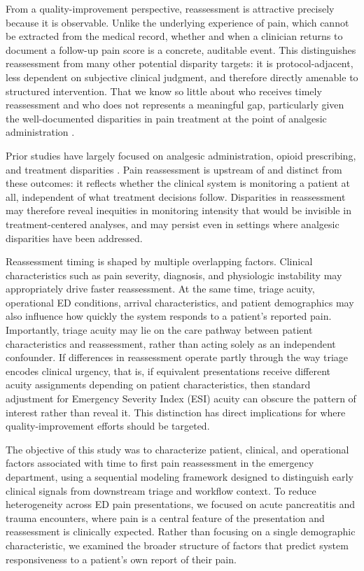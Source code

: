 \documentclass[11pt]{article}
\begin{document}
From a quality-improvement perspective, reassessment is attractive precisely because it is observable.
Unlike the underlying experience of pain, which cannot be extracted from the medical record, whether and when a clinician returns to document a follow-up pain score is a concrete, auditable event.
This distinguishes reassessment from many other potential disparity targets: it is protocol-adjacent, less dependent on subjective clinical judgment, and therefore directly amenable to structured intervention.
That we know so little about who receives timely reassessment and who does not represents a meaningful gap, particularly given the well-documented disparities in pain treatment at the point of analgesic administration \citep{Pletcher2008,Anderson2009}.

Prior studies have largely focused on analgesic administration, opioid prescribing, and treatment disparities \citep{Pletcher2008,Vigil2014}.
Pain reassessment is upstream of and distinct from these outcomes: it reflects whether the clinical system is monitoring a patient at all, independent of what treatment decisions follow.
Disparities in reassessment may therefore reveal inequities in monitoring intensity that would be invisible in treatment-centered analyses, and may persist even in settings where analgesic disparities have been addressed.

Reassessment timing is shaped by multiple overlapping factors.
Clinical characteristics such as pain severity, diagnosis, and physiologic instability may appropriately drive faster reassessment.
At the same time, triage acuity, operational ED conditions, arrival characteristics, and patient demographics may also influence how quickly the system responds to a patient's reported pain.
Importantly, triage acuity may lie on the care pathway between patient characteristics and reassessment, rather than acting solely as an independent confounder.
If differences in reassessment operate partly through the way triage encodes clinical urgency, that is, if equivalent presentations receive different acuity assignments depending on patient characteristics, then standard adjustment for Emergency Severity Index (ESI) acuity can obscure the pattern of interest rather than reveal it.
This distinction has direct implications for where quality-improvement efforts should be targeted.

The objective of this study was to characterize patient, clinical, and operational factors associated with time to first pain reassessment in the emergency department, using a sequential modeling framework designed to distinguish early clinical signals from downstream triage and workflow context.
To reduce heterogeneity across ED pain presentations, we focused on acute pancreatitis and trauma encounters, where pain is a central feature of the presentation and reassessment is clinically expected.
Rather than focusing on a single demographic characteristic, we examined the broader structure of factors that predict system responsiveness to a patient's own report of their pain.
\end{document}
